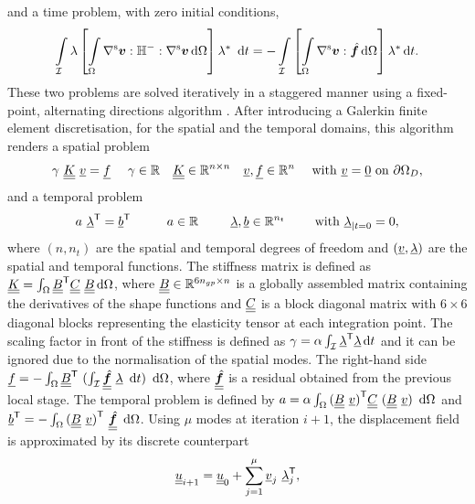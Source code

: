 and a time problem, with zero initial conditions,
\begin{equation}
	\int \displaylimits_{{\cal I}} \lambda \left[ \int \displaylimits_\Omega  {\rm \nabla^s} \mbox{$\bm  v$} : {\mathbb{ H}}^- : {\rm \nabla^s} \mbox{$\bm  v$} {\,\rm d} \Omega \right]  \lambda^\ast \ {\,\rm d} t = - \int \displaylimits_{{\cal I}} \left[ \int \displaylimits_\Omega {\rm \nabla^s} \mbox{$\bm  v$} : \mbox{\ensuremath{\hat{\bm f}}} {\,\rm d} \Omega \right] \lambda^\ast {\,\rm d} t.
\end{equation}
These two problems are solved iteratively in a staggered manner using a fixed-point, alternating directions algorithm \parencite{chinesta2014separated}. After introducing a {Galerkin finite element discretisation}, for the spatial and the temporal domains, this algorithm renders a spatial problem
\begin{equation}
	\gamma\ \underline{\underline{K}}\ \underline{v} = \underline{f} \quad \ \gamma \in {\mathbb{ R}} \quad \underline{\underline{K}} \in {\mathbb{ R}}^{n \times n} \quad \underline{v}, \underline{f} \in {\mathbb{ R}}^{n} \quad \text{ with } \underline{v} =\underline{0} \text{ on } \partial \Omega_D,
	\label{eq:space_problem}
\end{equation}
and a temporal problem
\begin{equation}
	a\ {\underline{\lambda}}^{\sf T} = {\underline{b}}^{\sf T}  \qquad\ \ \, a \in {\mathbb{ R}} \qquad \ \, \underline{\lambda}, \underline{b} \in {\mathbb{ R}}^{n_t} \qquad \text{ with } \underline{\lambda}_{|t=0} = 0,
	\label{eq:time_problem}
\end{equation}
where $(n, n_t)$ are the spatial and temporal degrees of freedom and $(\underline{v}, \underline{\lambda})$ are the spatial and temporal functions. The stiffness matrix is defined as $\underline{\underline{K}} = \int \displaylimits_\Omega {\underline{\underline{B}}}^{\sf T} \underline{\underline{C}}\ \underline{\underline{B}} {\,\rm d} \Omega$, where $\underline{\underline{B}} \in {\mathbb{ R}}^{6 n_{gp} \times n}$ is a globally assembled matrix containing the derivatives of the shape functions and $\underline{\underline{C}}$ is a block diagonal matrix with $6\times6$ diagonal blocks representing the elasticity tensor at each integration point. The scaling factor in front of the stiffness is defined as $\gamma =  \alpha \int \displaylimits_{{\cal I}} {\underline{\lambda}}^{\sf T} {\underline{\lambda}} {\,\rm d} t $ and it can be ignored due to the normalisation of the spatial modes. The right-hand side $ \underline{f} = - \int \displaylimits_\Omega {\underline{\underline{B}}}^{\sf T}\ (\int \displaylimits_{{\cal I}} \underline{\underline{\mbox{\ensuremath{\hat{\bm f}}}}}\ \underline{\lambda} \ {\,\rm d} t)\ {\,\rm d} \Omega$, where $\underline{\underline{\mbox{\ensuremath{\hat{\bm f}}}}}$ is a residual obtained from the previous local stage. The temporal problem is defined by $a = \alpha \int \displaylimits_\Omega {(\underline{\underline{B}} \ \underline{v})}^{\sf T} \underline{\underline{C}}\ (\underline{\underline{B}}\ \underline{v})\ {\,\rm d} \Omega $ and $ {\underline{b}}^{\sf T} = - \int \displaylimits_\Omega {(\underline{\underline{B}} \ \underline{v})}^{\sf T}\  \underline{\underline{\mbox{\ensuremath{\hat{\bm f}}}}} \ {\,\rm d} \Omega$. Using $\mu$ modes at iteration $i+1$, the displacement field is approximated by its discrete counterpart
\begin{equation}
	\underline{\underline{u}}_{i+1}^{{\rm{}}} = \underline{\underline{u}}_0 + \sum_{j=1}^{\mu} \underline{v}_j\ {\underline{\lambda}}^{\sf T}_j,
	\label{eqdisplacementcorrection}
\end{equation}
